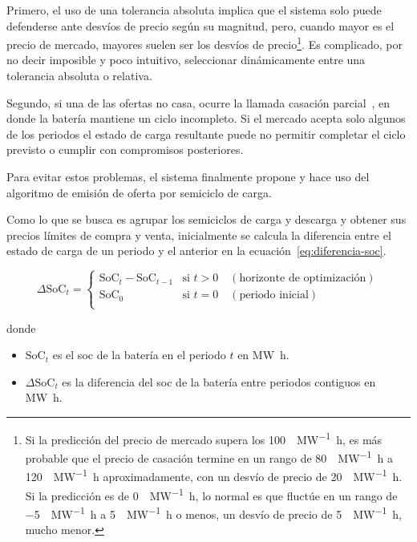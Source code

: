   Primero, el uso de una tolerancia absoluta implica que el sistema solo puede defenderse ante desvíos de precio según su magnitud, pero, cuando mayor es el precio de mercado, mayores suelen ser los desvíos de precio\footnote{Si la predicción del precio de mercado supera los \SI{100}{\text{\euro}\per\mega\watt\hour}, es más probable que el precio de casación termine en un rango de \SI{80}{\text{\euro}\per\mega\watt\hour} a \SI{120}{\text{\euro}\per\mega\watt\hour} aproximadamente, con un desvío de precio de \SI{20}{\text{\euro}\per\mega\watt\hour}. Si la predicción es de \SI{0}{\text{\euro}\per\mega\watt\hour}, lo normal es que fluctúe en un rango de \SI{-5}{\text{\euro}\per\mega\watt\hour} a \SI{5}{\text{\euro}\per\mega\watt\hour} o menos, un desvío de precio de \SI{5}{\text{\euro}\per\mega\watt\hour}, mucho menor.}. Es complicado, por no decir imposible y poco intuitivo, seleccionar dinámicamente entre una tolerancia absoluta o relativa.

  Segundo, si una de las ofertas no casa, ocurre la llamada casación parcial~\cite{cnmc2024mercados}, en donde la batería mantiene un ciclo incompleto. Si el mercado acepta solo algunos de los periodos el estado de carga resultante puede no permitir completar el ciclo previsto o cumplir con compromisos posteriores.

  Para evitar estos problemas, el sistema finalmente propone y hace uso del algoritmo de emisión de oferta por semiciclo de carga.

  Como lo que se busca es agrupar los semiciclos de carga y descarga y obtener sus precios límites de compra y venta, inicialmente se calcula la diferencia entre el estado de carga de un periodo y el anterior en la ecuación~\ref{eq:diferencia-soc}.

  \begin{samepage}

    \begin{equation}
      \label{eq:diferencia-soc}
      \Delta \mathrm{SoC}_{t} =
      \begin{cases}
        \mathrm{SoC}_{t} - \mathrm{SoC}_{t-1} & \text{si } t > 0 \quad (\text{horizonte de optimización}) \\
        \mathrm{SoC}_{0}                      & \text{si } t = 0 \quad (\text{periodo inicial})           \\
      \end{cases}
    \end{equation}

    donde

    \begin{itemize}

      \item \( \mathrm{SoC}_{t} \) es el \gls{soc} de la batería en el periodo \( t \) en \si{{\mega\watt\hour}}.

      \item \( \Delta \mathrm{SoC}_{t} \) es la diferencia del \gls{soc} de la batería entre periodos contiguos en \si{{\mega\watt\hour}}.

    \end{itemize}

  \end{samepage}

